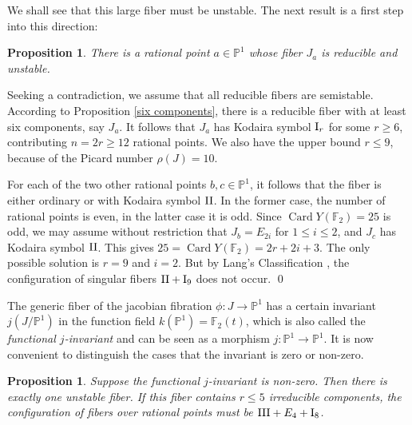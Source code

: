\documentclass[oneside, 12pt]{amsart}
\newcommand\mylabel[1]{\label{#1}\marginpar{\vspace{-1ex}\medskip\medskip\footnotesize \tt #1}}
\renewcommand\mylabel[1]{\label{#1}}
\newtheorem{proposition}[theorem]{Proposition}
\theoremstyle{definition}
\theoremstyle{remark}
\newcommand{\FF}{\mathbb{F}}
\newcommand{\PP}{\mathbb{P}}
\newcommand{\Card}{\operatorname{Card}}
\newcommand{\I}{\text{\rm I}}
\newcommand{\II}{\text{\rm II}}
\newcommand{\III}{\text{\rm III}}
\newcommand{\ra}{\rightarrow}
\begin{document}
\medskip
We shall see that this large fiber must be unstable. The next result is a  first step into this direction:

\begin{proposition}
\mylabel{unstable fiber}
There is a rational point $a\in\PP^1$ whose fiber $J_a$ is reducible and unstable.
\end{proposition}

\proof
Seeking a contradiction, we assume that all reducible fibers are semistable.
According to Proposition \ref{six components}, there is a reducible fiber with at least six components, 
say $J_a$.
It follows that $J_a$ has Kodaira symbol $\I_r$ for some $r\geq 6$,
contributing $n=2r\geq 12$ rational points. We also have the upper bound $r\leq 9$, because
of the Picard number $\rho(J)=10$.

For each of the  two other rational points $b,c\in \PP^1$, it follows that the fiber 
is either ordinary or with Kodaira symbol $\II$.
In the former case, the number of rational points is even, in the latter case it is odd.
Since $\Card Y(\FF_2)=25$ is odd, we may assume without restriction that $J_b=E_{2i}$
for $1\leq i\leq 2$, and  $J_c$ has Kodaira symbol $\II$.
This gives $25=\Card Y(\FF_2) = 2r +  2i+3$. The only possible solution is $r=9$ and $i=2$.
But by Lang's Classification \cite{Lang 2000}, the configuration of singular fibers $\II+\I_9$ does not occur.
\qed

\medskip
The generic fiber   of the jacobian fibration $\phi:J\ra\PP^1$
has a certain invariant $j(J/\PP^1)$ in the function field $ k(\PP^1)=\FF_2(t)$, which is also called
the \emph{functional $j$-invariant} and  can   be seen  as a morphism $j:\PP^1\ra\PP^1$.
It is now convenient to distinguish the cases that the invariant   is zero or non-zero.

\begin{proposition}
\mylabel{non-constant j-invariant}
Suppose the functional $j$-invariant   is non-zero.
Then there is  exactly one  unstable fiber.
If this fiber contains $r\leq 5$ irreducible components, the configuration of fibers over   rational points
must be $\III+E_4+ \I_8$. 
\end{proposition}
\end{document}

